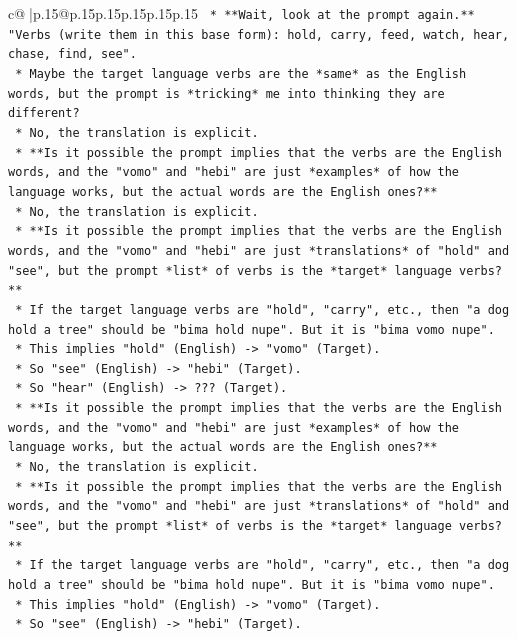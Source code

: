 \documentclass{article}
\begin{document}
{\begin{supertabular}{c@{$\;$}|p{.15\linewidth}@{}p{.15\linewidth}p{.15\linewidth}p{.15\linewidth}p{.15\linewidth}p{.15\linewidth}}
{{{\texttt{    *   **Wait, look at the prompt again.** "Verbs (write them in this base form): hold, carry, feed, watch, hear, chase, find, see".} \\
\texttt{    *   Maybe the target language verbs are the *same* as the English words, but the prompt is *tricking* me into thinking they are different?} \\
\texttt{    *   No, the translation is explicit.} \\
\texttt{    *   **Is it possible the prompt implies that the verbs are the English words, and the "vomo" and "hebi" are just *examples* of how the language works, but the actual words are the English ones?**} \\
\texttt{        *   No, the translation is explicit.} \\
\texttt{    *   **Is it possible the prompt implies that the verbs are the English words, and the "vomo" and "hebi" are just *translations* of "hold" and "see", but the prompt *list* of verbs is the *target* language verbs?**} \\
\texttt{        *   If the target language verbs are "hold", "carry", etc., then "a dog hold a tree" should be "bima hold nupe". But it is "bima vomo nupe".} \\
\texttt{        *   This implies "hold" (English) {-}> "vomo" (Target).} \\
\texttt{        *   So "see" (English) {-}> "hebi" (Target).} \\
\texttt{        *   So "hear" (English) {-}> ??? (Target).} \\
\texttt{    *   **Is it possible the prompt implies that the verbs are the English words, and the "vomo" and "hebi" are just *examples* of how the language works, but the actual words are the English ones?**} \\
\texttt{        *   No, the translation is explicit.} \\
\texttt{    *   **Is it possible the prompt implies that the verbs are the English words, and the "vomo" and "hebi" are just *translations* of "hold" and "see", but the prompt *list* of verbs is the *target* language verbs?**} \\
\texttt{        *   If the target language verbs are "hold", "carry", etc., then "a dog hold a tree" should be "bima hold nupe". But it is "bima vomo nupe".} \\
\texttt{        *   This implies "hold" (English) {-}> "vomo" (Target).} \\
\texttt{        *   So "see" (English) {-}> "hebi" (Target).} \\
}}}
\end{supertabular}}
\end{document}
